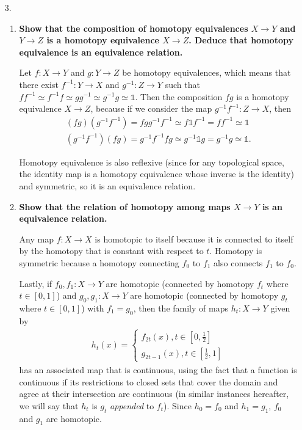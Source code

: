 \documentclass[a4paper,12pt]{article}
\begin{document}
\begin{enumerate}
    \item[3.]
        \begin{enumerate}[label=(\alph*)]
            \item
                \boldmath\textbf{Show that the composition of homotopy equivalences $X \to Y$ and $Y \to Z$ is a homotopy equivalence $X \to Z$. Deduce that homotopy equivalence is an equivalence relation.
                }\unboldmath \par
                Let $f : X \to Y$ and $g : Y \to Z$ be homotopy equivalences, which means that there exist $f^{-1} : Y \to X$ and $g^{-1} : Z \to Y$ such that $ff^{-1} \simeq f^{-1}f \simeq gg^{-1} \simeq g^{-1}g \simeq \mathds{1}$. Then the composition $fg$ is a homotopy equivalence $X \to Z$, because if we consider the map $g^{-1}f^{-1} : Z \to X$, then
                \begin{gather*}
                    (fg)(g^{-1}f^{-1}) = fgg^{-1}f^{-1} \simeq f\mathds{1}f^{-1} = ff^{-1} \simeq \mathds{1} \\
                    (g^{-1}f^{-1})(fg) = g^{-1}f^{-1}fg \simeq g^{-1}\mathds{1}g = g^{-1}g \simeq \mathds{1}.
                \end{gather*} \par
                Homotopy equivalence is also reflexive (since for any topological space, the identity map is a homotopy equivalence whose inverse is the identity) and symmetric, so it is an equivalence relation.

            \item
                \boldmath\textbf{Show that the relation of homotopy among maps $X \to Y$ is an equivalence relation.
                }\unboldmath \par
                Any map $f : X \to X$ is homotopic to itself because it is connected to itself by the homotopy that is constant with respect to $t$. Homotopy is symmetric because a homotopy connecting $f_0$ to $f_1$ also connects $f_1$ to $f_0$. \par
                Lastly, if $f_0, f_1 : X \to Y$ are homotopic (connected by homotopy $f_t$ where $t \in [0, 1]$) and $g_0, g_1 : X \to Y$ are homotopic (connected by homotopy $g_t$ where $t \in [0, 1]$) with $f_1 = g_0$, then the family of maps $h_t : X \to Y$ given by
                \begin{align*}
                    h_t(x) = \begin{cases}
                        f_{2t}(x), t \in [0, \frac{1}{2}] \\
                        g_{2t - 1}(x), t \in [\frac{1}{2}, 1]
                    \end{cases}
                \end{align*}
                has an associated map that is continuous, using the fact that a function is continuous if its restrictions to closed sets that cover the domain and agree at their intersection are continuous (in similar instances hereafter, we will say that $h_t$ is $g_t$ \emph{appended} to $f_t$). Since $h_0 = f_0$ and $h_1 = g_1$, $f_0$ and $g_1$ are homotopic.


\end{enumerate}
\end{enumerate}
\end{document}

